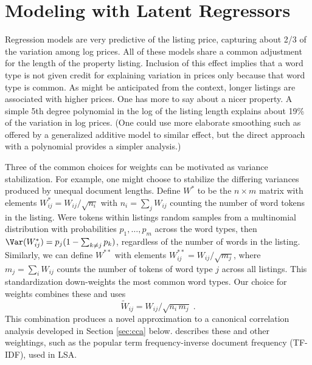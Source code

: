\documentclass[12pt]{article}\usepackage[]{graphicx}\usepackage[]{color}
\begin{document}
\section{Modeling with Latent Regressors}
\label{sec:modeling}



 Regression models are very predictive of the listing price, capturing
 about 2/3 of the variation among log prices.  All of these models
 share a common adjustment for the length of the property listing.
  Inclusion of this effect implies that a word type is not given
 credit for explaining variation in prices only because that word type
 is common.  As might be anticipated from the context, longer listings
 are associated with higher prices.  One has more to say about a nicer
 property.  A simple 5th degree polynomial in the log of the listing
 length explains about 19\% of the variation in
 log prices.  (One could use more elaborate smoothing such as offered
 by a generalized additive model to similar effect, but the direct
 approach with a polynomial provides a simpler analysis.)


 Three of the common choices for weights can be motivated as variance stabilization.
 For example, one might choose to stabilize the differing variances produced by
 unequal document lengths.  Define
 ${W}^{*}$ to be the $n \times m$ matrix with elements ${W}^{*}_{ij} =
 W_{ij}/\sqrt{n_i}$ with $n_i = \sum_j W_{ij}$ counting the number of word
 tokens in the \ith listing.  Were tokens within listings random samples from a
 multinomial distribution with probabilities $p_{1}, \ldots, p_{m}$ across the word types,
 then $\Var({W}^{*}_{ij}) = p_j(1-\sum_{k\ne j} p_k)$, regardless of the
 number of words in the listing.  Similarly, we can define $W^{**}$ with elements
 $W^{**}_{ij} = W_{ij}/\sqrt{m_j}$, where $m_j = \sum_i W_{ij}$ counts the
 number of tokens of word type $j$ across all listings. This standardization
 down-weights the most common word types.  Our choice for weights combines these and uses
 \begin{equation}
   \widetilde{W}_{ij} = W_{ij}/\sqrt{n_i\,m_j} \;.
 \label{eq:Wtij}
 \end{equation}
 This combination produces a novel approximation to a canonical
 correlation analysis developed in Section \ref{sec:cca}
 below. \citet{turney10} describes these and other weightings, such as
 the popular term frequency-inverse document frequency (TF-IDF), used
 in LSA.
\end{document}

